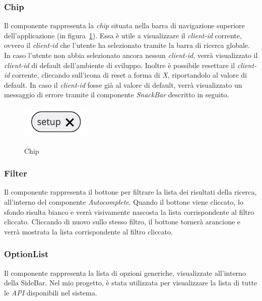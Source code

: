 \subsubsection{Chip}\label{subsubsec:chip}
Il componente rappresenta la \textit{chip} situata nella barra di navigazione superiore dell'applicazione (in figura~\ref{fig:chip}).
Essa è utile a visualizzare il \textit{client-id} corrente, ovvero il \textit{client-id} che l'utente ha selezionato tramite la barra di ricerca globale.
In caso l'utente non abbia selezionato ancora nessun \textit{client-id}, verrà visualizzato il \textit{client-id} di default dell'ambiente di sviluppo.
Inoltre è possibile resettare il \textit{client-id} corrente, cliccando sull'icona di reset a forma di \textit{X}, riportandolo al valore di default.
In caso il \textit{client-id} fosse già al valore di default, verrà visualizzato un messaggio di errore tramite il componente \textit{SnackBar} descritto in seguito.

\begin{figure}[ht]
  \centering
  \includegraphics[width=0.3\textwidth, alt={Chip contenente il client id corrente}]{images/frontend/Chip.jpg}
  \caption{Chip}\label{fig:chip}
\end{figure}


\subsubsection{Filter}\label{subsubsec:filter}
Il componente rappresenta il bottone per filtrare la lista dei risultati della ricerca, all'interno del componente \textit{Autocomplete}.
Quando il bottone viene cliccato, lo sfondo risulta bianco e verrà visivamente nascosta la lista corrispondente al filtro cliccato.
Cliccando di nuovo sullo stesso filtro, il bottone tornerà arancione e verrà  mostrata la lista corrispondente al filtro cliccato.


\subsubsection{OptionList}\label{subsubsec:option-list}
Il componente rappresenta la lista di opzioni generiche, visualizzate all'interno della SideBar. Nel mio progetto, è stata utilizzata per visualizzare la lista
di tutte le \textit{API} disponibili nel sistema. 


